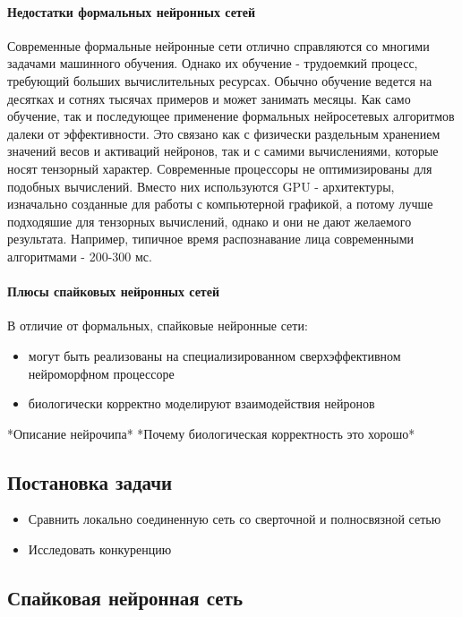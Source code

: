 \documentclass[a4paper]{article}
\begin{document}
\paragraph{Недостатки формальных нейронных сетей}
Современные формальные нейронные сети отлично справляются со многими задачами машинного обучения. Однако их обучение - трудоемкий процесс, требующий больших вычислительных ресурсах. Обычно обучение ведется на десятках и сотнях тысячах примеров и может занимать месяцы. Как само обучение, так и последующее применение формальных нейросетевых алгоритмов далеки от эффективности. Это связано как с физически раздельным хранением значений весов и активаций нейронов, так и с самими вычислениями, которые носят тензорный характер. Современные процессоры не оптимизированы для подобных вычислений. Вместо них используются GPU - архитектуры, изначально созданные для работы с компьютерной графикой, а потому лучше подходяшие для тензорных вычислений, однако и они не дают желаемого результата. Например, типичное время распознавание лица современными алгоритмами - 200-300 мс.

\paragraph{Плюсы спайковых нейронных сетей}
В отличие от формальных, спайковые нейронные сети:

\begin{itemize}
 \item могут быть реализованы на специализированном сверхэффективном нейроморфном процессоре
 \item биологически корректно моделируют взаимодействия нейронов
\end{itemize}


*Описание нейрочипа*
*Почему биологическая корректность это хорошо*

\subsection{Постановка задачи}
\begin{itemize}
 \item Сравнить локально соединенную сеть со сверточной и полносвязной сетью
 \item Исследовать конкуренцию
\end{itemize}


\subsection{Спайковая нейронная сеть}
\end{document}
